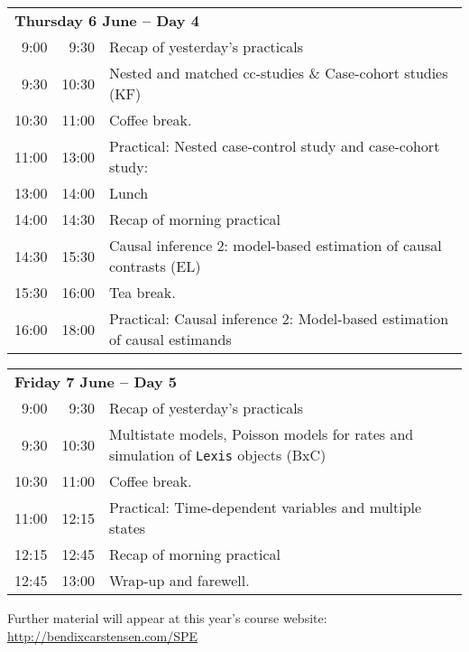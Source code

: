 \documentclass[a4paper, 12pt]{article}
\begin{document}
\noindent
\begin{tabular}{r@{ -- }rp{13cm}}
\multicolumn{3}{l}{\bf Thursday 6 June -- Day 4} \\
 9:00 &  9:30 & Recap of yesterday's practicals \\
 9:30 & 10:30 & Nested and matched cc-studies \& Case-cohort studies (KF)\\
10:30 & 11:00 & Coffee break. \\
11:00 & 13:00 & Practical: Nested case-control study and case-cohort study: \\ %
13:00 & 14:00 & Lunch \\
14:00 & 14:30 & Recap of morning practical \\
14:30 & 15:30 & Causal inference 2: model-based estimation of causal
                contrasts (EL)\\ %
15:30 & 16:00 & Tea break. \\
16:00 & 18:00 & Practical: Causal inference 2: Model-based estimation of causal estimands \\ %

\end{tabular}

\noindent
\begin{tabular}{r@{ -- }rp{13cm}}
\multicolumn{3}{l}{\bf Friday 7 June -- Day 5} \\
 9:00 &  9:30 & Recap of yesterday's practicals \\
 9:30 & 10:30 & Multistate models, Poisson models for rates and
                simulation of \texttt{Lexis} objects (BxC)\\
10:30 & 11:00 & Coffee break. \\
11:00 & 12:15 & Practical: Time-dependent variables and multiple states\\ %
12:15 & 12:45 & Recap of morning practical \\
12:45 & 13:00 & Wrap-up and farewell.\\
\end{tabular}
\vfill
\noindent
Further material will appear at this year's course website:\\
\url{http://bendixcarstensen.com/SPE}
\end{document}
